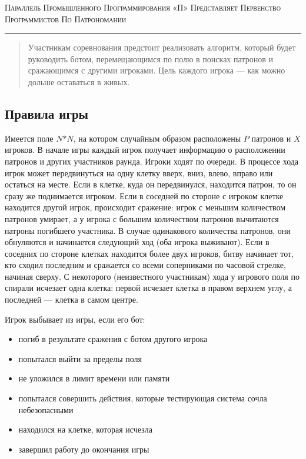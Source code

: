 \documentclass[a4paper,12pt]{article}
\begin{document}
\begin{center}
{\small\textsc{Параллель Промышленного Программирования «П» Представляет Первенство Программистов По Патрономании}}
\vskip 1pt \hrule \vskip 3pt

\end{center}
\begin{abstract}
Участникам соревнования предстоит реализовать алгоритм, который будет руководить ботом, перемещающимся по полю в поисках патронов и сражающимся с другими игроками. Цель каждого игрока — как можно дольше оставаться в живых.
\end{abstract}
\subsection{Правила игры}
Имеется поле $N$$*$$N$, на котором случайным образом расположены $P$ патронов и $X$ игроков. В начале игры каждый игрок получает информацию о расположении патронов и других участников раунда. Игроки ходят по очереди. В процессе хода игрок может передвинуться на одну клетку вверх, вниз, влево, вправо или остаться на месте. Если в клетке, куда он передвинулся, находится патрон, то он сразу же поднимается игроком. Если в соседней по стороне с игроком клетке находится другой игрок, происходит сражение: игрок с меньшим количеством патронов умирает, а у игрока с большим количеством патронов вычитаются патроны погибшего участника. В случае одинакового количества патронов, они обнуляются и начинается следующий ход (оба игрока выживают). Если в соседних по стороне клетках находится более двух игроков, битву начинает тот, кто сходил последним и сражается со всеми соперниками по часовой стрелке, начиная сверху. С некоторого (неизвестного участникам) хода у игрового поля по спирали исчезает одна клетка: первой исчезает клетка в правом верхнем углу, а последней — клетка в самом центре.
\begin{flushleft}
Игрок выбывает из игры, если его бот:
\begin{itemize}
\item погиб в результате сражения с ботом другого игрока
\item попытался выйти за пределы поля
\item не уложился в лимит времени или памяти
\item попытался совершить действия, которые тестирующая система сочла небезопасными
\item находился на клетке, которая исчезла
\item завершил работу до окончания игры
\end{itemize}
\end{flushleft}
\end{document}
